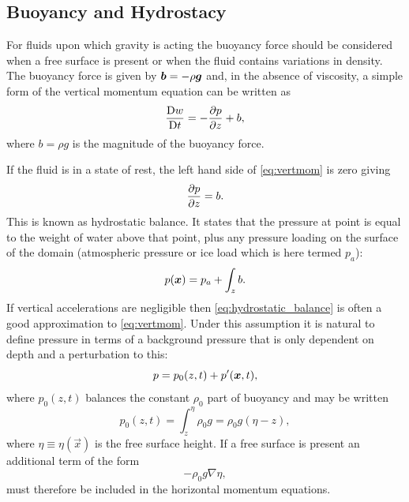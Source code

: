 \subsection{Buoyancy and Hydrostacy}\label{sec:hydrostacy}

For fluids upon which gravity is acting the buoyancy force should be considered
when a free surface is present or when the fluid contains variations in density. The buoyancy force is given by $\vec{b}=-\rho\bmg$
and, in the absence of viscosity, a simple form of the vertical momentum equation can be written as
\begin{equation}\label{eq:vertmom}
\DDt[t]{w} = -\ppx[z]{p} + b,
\end{equation}
where $b=\rho g$ is the magnitude of the buoyancy force.


If the fluid is in a state of rest, the left hand side of \eqref{eq:vertmom} is zero giving
\begin{equation}\label{eq:hydrostatic_balance}
\ppx[z]{p} = b.
\end{equation}
This is known as hydrostatic balance. It states that the pressure at point
is equal to the weight of water above that point, plus any pressure loading on the surface of the
domain (\eg atmospheric pressure or ice load which is here termed $p_a$):
\begin{equation*}
p(\bmx) = p_a + \int_z b.
\end{equation*}
If vertical accelerations are negligible then \eqref{eq:hydrostatic_balance} is
often a good approximation to \eqref{eq:vertmom}. Under this assumption it is natural
to define pressure in terms of a background pressure that is
only dependent on depth and a perturbation to this:
\begin{equation*}
p=p_0(z,t)+p'(\bmx,t),
\end{equation*}
where $p_0(z,t)$ balances the constant $\rho_0$ part of buoyancy and may be written
\begin{equation*}
p_0(z,t) = \int_z^\eta \rho_0 g = \rho_0 g(\eta - z),
\end{equation*}
where $\eta\equiv\eta(\vec x)$ is the free surface height. If a free surface is present an
additional term of the form
\begin{equation*}
-\rho_0g\nabla\eta,
\end{equation*}
must therefore be included in the horizontal momentum equations.

